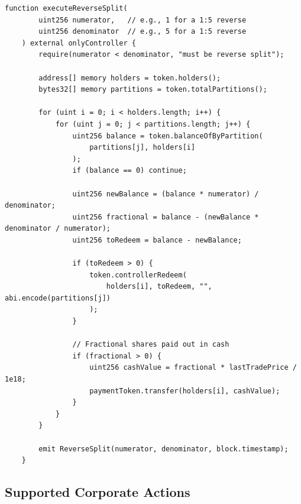 \documentclass[11pt,a4paper]{article}
\begin{document}
\begin{lstlisting}[language=Solidity,caption={Reverse split with fractional share handling.}]
    function executeReverseSplit(
        uint256 numerator,   // e.g., 1 for a 1:5 reverse
        uint256 denominator  // e.g., 5 for a 1:5 reverse
    ) external onlyController {
        require(numerator < denominator, "must be reverse split");

        address[] memory holders = token.holders();
        bytes32[] memory partitions = token.totalPartitions();

        for (uint i = 0; i < holders.length; i++) {
            for (uint j = 0; j < partitions.length; j++) {
                uint256 balance = token.balanceOfByPartition(
                    partitions[j], holders[i]
                );
                if (balance == 0) continue;

                uint256 newBalance = (balance * numerator) / denominator;
                uint256 fractional = balance - (newBalance * denominator / numerator);
                uint256 toRedeem = balance - newBalance;

                if (toRedeem > 0) {
                    token.controllerRedeem(
                        holders[i], toRedeem, "", abi.encode(partitions[j])
                    );
                }

                // Fractional shares paid out in cash
                if (fractional > 0) {
                    uint256 cashValue = fractional * lastTradePrice / 1e18;
                    paymentToken.transfer(holders[i], cashValue);
                }
            }
        }

        emit ReverseSplit(numerator, denominator, block.timestamp);
    }
\end{lstlisting}

\subsection{Supported Corporate Actions}
\end{document}
